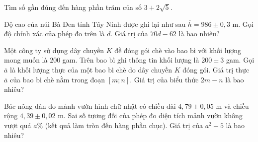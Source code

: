 \begin{ex}%
	Tìm số gần đúng đến hàng phần trăm của số $3+2\sqrt{5}$.
	\par
\end{ex}
\begin{ex}%
	Độ cao của núi Bà Đen tỉnh Tây Ninh được ghi lại như sau $\overline{h}=986\pm 0{,}3$ m. Gọi độ chính xác của phép đo trên là $d$. Giá trị của $70d-62$ là bao nhiêu?
	\par
\end{ex}
\begin{ex}%
	Một công ty sử dụng dây chuyền $K$ đề đóng gói chè vào bao bì với khối lượng mong muốn là $200$ gam. Trên bao bì ghi thông tin khối lượng là $200 \pm 3$ gam. Gọi $\overline{a}$ là khối lượng thực của một bao bì chè do dây chuyền $K$ đóng gói. Giá trị thực $\overline{a}$ của bao bì chè nằm trong đoạn $[m;n]$. Giá trị của biểu thức $2m-n$ là bao nhiêu?
	\par
\end{ex}
\begin{ex}%
	Bác nông dân đo mảnh vườn hình chữ nhật có chiều dài $ 4{,}79\pm 0{,}05$ m và chiều rộng $ 4{,}39\pm 0{,}02 $ m. Sai số tương đối của phép đo diện tích mảnh vườn không vượt quá $a\%$ (kết quả làm tròn đến hàng phần chục). Giá trị của $a^2+5$ là bao nhiêu?
	\par
\end{ex}
